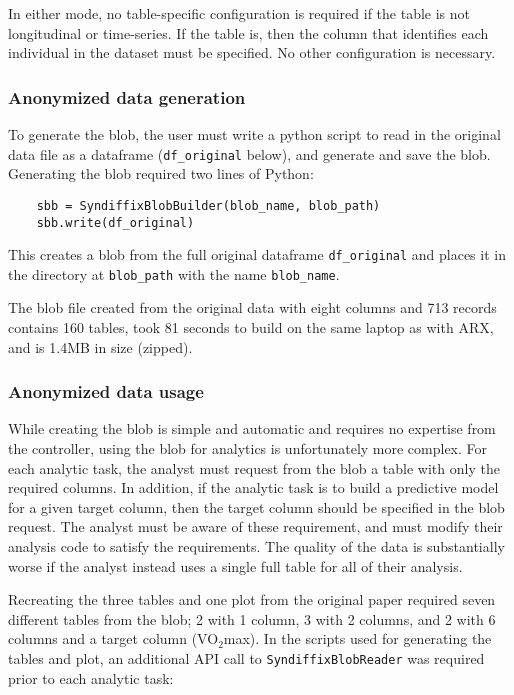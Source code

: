 \documentclass[10pt]{article}
\begin{document}
In either mode, no table-specific configuration is required if the table is not longitudinal or time-series. If the table is, then the column that identifies each individual in the dataset must be specified. No other configuration is necessary.

\subsubsection*{Anonymized data generation}

To generate the blob, the user must write a python script to read in the original data file as a dataframe (\texttt{df\_original} below), and generate and save the blob. Generating the blob required two lines of Python:

{\small
\begin{verbatim}
    sbb = SyndiffixBlobBuilder(blob_name, blob_path)
    sbb.write(df_original)
\end{verbatim}
}

This creates a blob from the full original dataframe \texttt{df\_original} and places it in the directory at \texttt{blob\_path} with the name \texttt{blob\_name}.
 
The blob file created from the original data with eight columns and 713 records contains 160 tables, took 81 seconds to build on the same laptop as with ARX, and is 1.4MB in size (zipped).

\subsubsection*{Anonymized data usage}

While creating the blob is simple and automatic and requires no expertise from the controller, using the blob for analytics is unfortunately more complex. For each analytic task, the analyst must request from the blob a table with only the required columns. In addition, if the analytic task is to build a predictive model for a given target column, then the target column should be specified in the blob request. The analyst must be aware of these requirement, and must modify their analysis code to satisfy the requirements. The quality of the data is substantially worse if the analyst instead uses a single full table for all of their analysis.

Recreating the three tables and one plot from the original paper required seven different tables from the blob; 2 with 1 column, 3 with 2 columns, and 2 with 6 columns and a target column (VO$_2$max). In the scripts used for generating the tables and plot, an additional API call to \texttt{SyndiffixBlobReader} was required prior to each analytic task:
\end{document}
